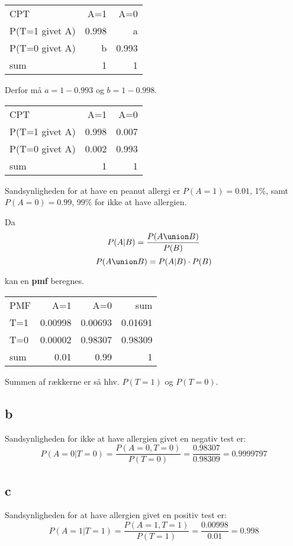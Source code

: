 \documentclass[11pt]{article}
\begin{document}
\begin{center}
\begin{tabular}{lrr}
CPT & A=1 & A=0\\
P(T=1 givet A) & 0.998 & a\\
P(T=0 givet A) & b & 0.993\\
sum & 1 & 1\\
\end{tabular}
\end{center}

Derfor må \(a = 1-0.993\) og \(b=1-0.998\).

\begin{center}
\begin{tabular}{lrr}
CPT & A=1 & A=0\\
P(T=1 givet A) & 0.998 & 0.007\\
P(T=0 givet A) & 0.002 & 0.993\\
sum & 1 & 1\\
\end{tabular}
\end{center}

Sandsynligheden for at have en peanut allergi er \(P(A = 1) = 0.01\), 1\%,
samt \(P(A = 0) = 0.99\), 99\% for ikke at have allergien.

Da
\[P(A|B) = \frac{P(A \union B)}{P(B)}\]
\[P(A \union B) = P(A|B)\cdot P(B)\]

kan en \textbf{pmf} beregnes.

\begin{center}
\begin{tabular}{lrrr}
PMF & A=1 & A=0 & sum\\
T=1 & 0.00998 & 0.00693 & 0.01691\\
T=0 & 0.00002 & 0.98307 & 0.98309\\
sum & 0.01 & 0.99 & 1\\
\end{tabular}
\end{center}

Summen af rækkerne er så hhv. \(P(T=1)\) og \(P(T=0)\).
\subsection*{b}
\label{sec:org874a91e}
Sandsynligheden for ikke at have allergien givet en negativ test er:
\[P(A=0|T=0)=\frac{P(A=0,T=0)}{P(T=0)}=\frac{0.98307}{0.98309}= 0.9999797\]
\subsection*{c}
\label{sec:org5db15a6}
Sandsynligheden for at have allergien givet en positiv test er:
\[P(A=1|T=1)=\frac{P(A=1,T=1)}{P(T=1)}=\frac{0.00998}{0.01}= 0.998\]
\end{document}
